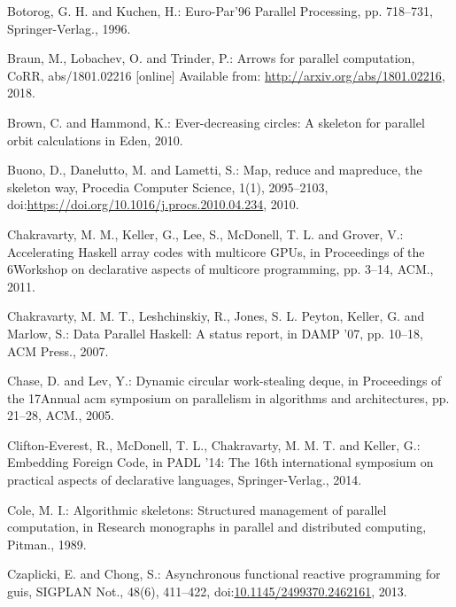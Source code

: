 \documentclass[paper=A4,twoside=true,openright,parskip=full,chapterprefix=true,headings=normal,bibliography=totoc,listof=totoc,titlepage=on,captions=tableabove,draft=false,british]{scrreprt}%
\begin{document}
\leavevmode\hypertarget{ref-botorog1996efficient}{}%
Botorog, G. H. and Kuchen, H.: Euro-Par'96 Parallel Processing, pp.
718--731, Springer-Verlag., 1996.

\leavevmode\hypertarget{ref-PArrowsPaper}{}%
Braun, M., Lobachev, O. and Trinder, P.: Arrows for parallel
computation, CoRR, abs/1801.02216 {[}online{]} Available from:
\url{http://arxiv.org/abs/1801.02216}, 2018.

\leavevmode\hypertarget{ref-brown2010ever}{}%
Brown, C. and Hammond, K.: Ever-decreasing circles: A skeleton for
parallel orbit calculations in Eden, 2010.

\leavevmode\hypertarget{ref-BUONO20102095}{}%
Buono, D., Danelutto, M. and Lametti, S.: Map, reduce and mapreduce, the
skeleton way, Procedia Computer Science, 1(1), 2095--2103,\\
doi:\href{https://doi.org/https://doi.org/10.1016/j.procs.2010.04.234}{https://doi.org/10.1016/j.procs.2010.04.234},
2010.

\leavevmode\hypertarget{ref-Chakravarty:2011:AHA:1926354.1926358}{}%
Chakravarty, M. M., Keller, G., Lee, S., McDonell, T. L. and Grover, V.:
Accelerating Haskell array codes with multicore GPUs, in Proceedings of
the 6Workshop on declarative aspects of multicore programming, pp.
3--14, ACM., 2011.

\leavevmode\hypertarget{ref-Chakravarty2007}{}%
Chakravarty, M. M. T., Leshchinskiy, R., Jones, S. L. Peyton, Keller, G.
and Marlow, S.: Data Parallel Haskell: A status report, in DAMP '07, pp.
10--18, ACM Press., 2007.

\leavevmode\hypertarget{ref-Chase:2005:DCW:1073970.1073974}{}%
Chase, D. and Lev, Y.: Dynamic circular work-stealing deque, in
Proceedings of the 17Annual acm symposium on parallelism in algorithms
and architectures, pp. 21--28, ACM., 2005.

\leavevmode\hypertarget{ref-CMCK14}{}%
Clifton-Everest, R., McDonell, T. L., Chakravarty, M. M. T. and Keller,
G.: Embedding Foreign Code, in PADL '14: The 16th international
symposium on practical aspects of declarative languages,
Springer-Verlag., 2014.

\leavevmode\hypertarget{ref-Cole1989}{}%
Cole, M. I.: Algorithmic skeletons: Structured management of parallel
computation, in Research monographs in parallel and distributed
computing, Pitman., 1989.

\leavevmode\hypertarget{ref-Czaplicki:2013:AFR:2499370.2462161}{}%
Czaplicki, E. and Chong, S.: Asynchronous functional reactive
programming for guis, SIGPLAN Not., 48(6), 411--422,
doi:\href{https://doi.org/10.1145/2499370.2462161}{10.1145/2499370.2462161},
2013.
\end{document}
